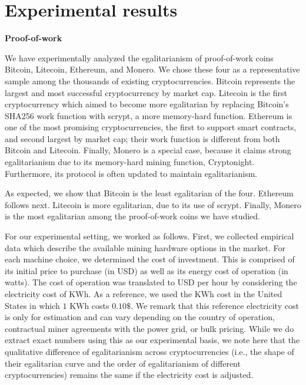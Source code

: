 \section{Experimental results}\label{sec:experiments}

\noindent\textbf{Proof-of-work}

\noindent
We have experimentally analyzed the egalitarianism of proof-of-work coins
Bitcoin, Litecoin, Ethereum, and Monero. We chose these four as a representative
sample among the thousands of existing cryptocurrencies. Bitcoin represents the
largest and most successful cryptocurrency by market cap. Litecoin is the first
cryptocurrency which aimed to become more egalitarian by replacing Bitcoin's
SHA256 work function with scrypt, a more memory-hard function. Ethereum is one
of the most promising cryptocurrencies, the first to support smart contracts,
and second largest by market cap; their work function is different from both
Bitcoin and Litecoin. Finally, Monero is a special case, because it claims
strong egalitarianism due to its memory-hard mining function, Cryptonight.
Furthermore, its protocol is often updated to maintain egalitarianism.

As expected, we show that Bitcoin is the least egalitarian of the four. Ethereum
follows next. Litecoin is more egalitarian, due to its use of scrypt. Finally,
Monero is the most egalitarian among the proof-of-work coins we have studied.


For our experimental setting, we worked as follows. First, we collected empirical
data which describe the available mining hardware options in the market. For
each machine choice, we determined the cost of investment. This is comprised
of its initial price to purchase (in USD) as well as its energy cost of
operation (in watts). The cost of operation was translated to USD per hour by
considering the electricity cost of KWh. As a reference, we used the KWh cost in
the United States in which $1$ KWh costs $0.10\$$. We remark that this reference
electricity cost is only for estimation and can vary depending on the country of
operation, contractual miner agreements with the power grid, or bulk pricing.
While we do extract exact numbers using this as our experimental basis, we note
here that the qualitative difference of egalitarianism across cryptocurrencies
(i.e., the shape of their egalitarian curve and the order of egalitarianism of
different cryptocurrencies) remains the same if the electricity cost is
adjusted.

